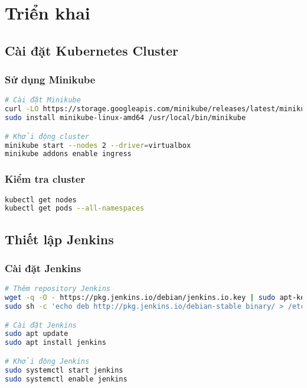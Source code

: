 \documentclass[12pt,a4paper]{article}
\begin{document}
\section{Triển khai}

\subsection{Cài đặt Kubernetes Cluster}

\subsubsection{Sử dụng Minikube}
\begin{lstlisting}[language=bash, caption=Khởi tạo Minikube cluster]
# Cài đặt Minikube
curl -LO https://storage.googleapis.com/minikube/releases/latest/minikube-linux-amd64
sudo install minikube-linux-amd64 /usr/local/bin/minikube

# Khởi động cluster
minikube start --nodes 2 --driver=virtualbox
minikube addons enable ingress
\end{lstlisting}

\subsubsection{Kiểm tra cluster}
\begin{lstlisting}[language=bash, caption=Kiểm tra trạng thái cluster]
kubectl get nodes
kubectl get pods --all-namespaces
\end{lstlisting}

\subsection{Thiết lập Jenkins}

\subsubsection{Cài đặt Jenkins}
\begin{lstlisting}[language=bash, caption=Cài đặt Jenkins trên Ubuntu]
# Thêm repository Jenkins
wget -q -O - https://pkg.jenkins.io/debian/jenkins.io.key | sudo apt-key add -
sudo sh -c 'echo deb http://pkg.jenkins.io/debian-stable binary/ > /etc/apt/sources.list.d/jenkins.list'

# Cài đặt Jenkins
sudo apt update
sudo apt install jenkins

# Khởi động Jenkins
sudo systemctl start jenkins
sudo systemctl enable jenkins
\end{lstlisting}
\end{document}
